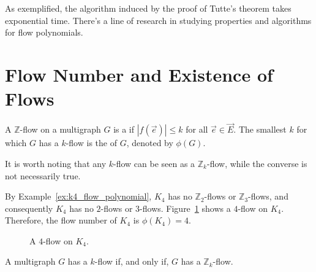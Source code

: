As exemplified, the algorithm induced by the proof of Tutte's theorem takes exponential time.
There's a line of research in studying properties and algorithms for flow polynomials.

\section{Flow Number and Existence of Flows}

\begin{definition}
	A \(\mathbb{Z}\)-flow on a multigraph \(G\) is a  if \(|f(\vec{e})| \leq k\) for all \(\vec{e} \in \vec{E}\).
	The smallest \(k\) for which \(G\) has a \(k\)-flow is the  of \(G\), denoted by \(\phi(G)\).
\end{definition}

It is worth noting that any \(k\)-flow can be seen as a \(\mathbb{Z}_k\)-flow,
while the converse is not necessarily true.

\begin{example}
	By Example~\ref{ex:k4_flow_polynomial}, \(K_4\) has no \(\mathbb{Z}_2\)-flows or \(\mathbb{Z}_3\)-flows,
	and consequently \(K_4\) has no \(2\)-flows or \(3\)-flows.
	Figure~\ref{fig:k4_4_flow} shows a \(4\)-flow on \(K_4\).
	Therefore, the flow number of \(K_4\) is \(\phi(K_4) = 4\).
\end{example}

\begin{figure}[htbp]
	\centering
	\caption{A \(4\)-flow on \(K_4\).}
	\label{fig:k4_4_flow}
\end{figure}


\begin{theorem}[Tutte (1950)] \label{thm:k-flow-Zk-flow}
	A multigraph \(G\) has a \(k\)-flow if, and only if, \(G\) has a \(\mathbb{Z}_k\)-flow.
\end{theorem}

